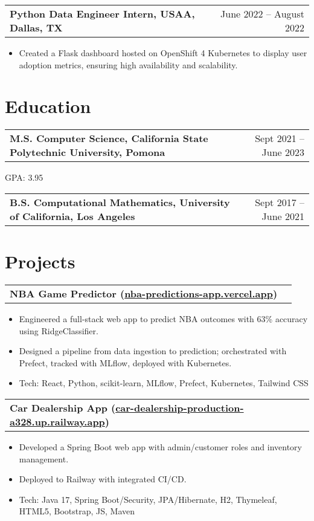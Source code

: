 \documentclass[10pt, letterpaper]{article}
\makeatletter
\newenvironment{highlights}{
    \begin{itemize}[
        topsep=0.10cm,
        parsep=0.10cm,
        partopsep=0pt,
        itemsep=0pt,
        leftmargin=10pt
    ]
}{
    \end{itemize}
}
\newenvironment{entry}[2]{
    \begin{tabular*}{\textwidth}{@{\extracolsep{\fill}} l r}
        \textbf{#1} & #2 \\
    \end{tabular*}
}{}
\makeatother
\begin{document}
    \vspace{0.2cm}
    \begin{entry}{Python Data Engineer Intern, USAA, Dallas, TX}{June 2022 -- August 2022}
    \end{entry}
    \begin{highlights}
        \item Created a Flask dashboard hosted on OpenShift 4 Kubernetes to display user adoption metrics, ensuring high availability and scalability.
    \end{highlights}

    \section{Education}

    \begin{entry}{M.S. Computer Science, California State Polytechnic University, Pomona}{Sept 2021 -- June 2023}
    \end{entry}
    GPA: 3.95

    \vspace{0.10cm}
    \begin{entry}{B.S. Computational Mathematics, University of California, Los Angeles}{Sept 2017 -- June 2021}
    \end{entry}

    \section{Projects}

    \begin{entry}{NBA Game Predictor (\href{https://nba-predictions-app.vercel.app/}{nba-predictions-app.vercel.app})}{}
    \end{entry}
    \begin{highlights}
        \item Engineered a full-stack web app to predict NBA outcomes with 63\% accuracy using RidgeClassifier.
        \item Designed a pipeline from data ingestion to prediction; orchestrated with Prefect, tracked with MLflow, deployed with Kubernetes.
        \item Tech: React, Python, scikit-learn, MLflow, Prefect, Kubernetes, Tailwind CSS
    \end{highlights}

    \vspace{0.2cm}
    \begin{entry}{Car Dealership App (\href{https://car-dealership-production-a328.up.railway.app/dealership/}{car-dealership-production-a328.up.railway.app})}{}
    \end{entry}
    \begin{highlights}
        \item Developed a Spring Boot web app with admin/customer roles and inventory management.
        \item Deployed to Railway with integrated CI/CD.
        \item Tech: Java 17, Spring Boot/Security, JPA/Hibernate, H2, Thymeleaf, HTML5, Bootstrap, JS, Maven
    \end{highlights}
\end{document}
